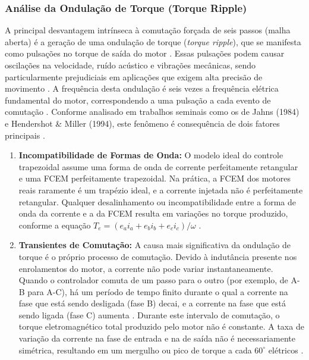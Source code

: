 \documentclass[12pt, a4paper, openright, oneside, brazilian]{abntex2}
\begin{document}
 \subsubsection{Análise da Ondulação de Torque (Torque Ripple)}
A principal desvantagem intrínseca à comutação forçada de seis passos (malha aberta) é a geração de uma ondulação de torque (\textit{torque ripple}), que se manifesta como pulsações no torque de saída do motor \cite{jahns1984, ali2017implementation}. Essas pulsações podem causar oscilações na velocidade, ruído acústico e vibrações mecânicas, sendo particularmente prejudiciais em aplicações que exigem alta precisão de movimento \cite{jahns1996pulsating}. A frequência desta ondulação é seis vezes a frequência elétrica fundamental do motor, correspondendo a uma pulsação a cada evento de comutação \cite{jahns1984}. Conforme analisado em trabalhos seminais como os de Jahns (1984) e Hendershot \& Miller (1994), este fenômeno é consequência de dois fatores principais \cite{kim2017, hendershot1994design}.

\begin{enumerate}
    \item \textbf{Incompatibilidade de Formas de Onda:} O modelo ideal do controle trapezoidal assume uma forma de onda de corrente perfeitamente retangular e uma FCEM perfeitamente trapezoidal. Na prática, a FCEM dos motores reais raramente é um trapézio ideal, e a corrente injetada não é perfeitamente retangular. Qualquer desalinhamento ou incompatibilidade entre a forma de onda da corrente e a da FCEM resulta em variações no torque produzido, conforme a equação $T_{e} = (e_{a}i_{a} + e_{b}i_{b} + e_{c}i_{c}) / \omega$ \cite{hendershot1994design}.

    \item \textbf{Transientes de Comutação:} A causa mais significativa da ondulação de torque é o próprio processo de comutação. Devido à indutância presente nos enrolamentos do motor, a corrente não pode variar instantaneamente. Quando o controlador comuta de um passo para o outro (por exemplo, de A-B para A-C), há um período de tempo finito durante o qual a corrente na fase que está sendo desligada (fase B) decai, e a corrente na fase que está sendo ligada (fase C) aumenta \cite{jahns1996pulsating, joice2013compensation}. Durante este intervalo de comutação, o torque eletromagnético total produzido pelo motor não é constante. A taxa de variação da corrente na fase de entrada e na de saída não é necessariamente simétrica, resultando em um mergulho ou pico de torque a cada $60^{\circ}$ elétricos \cite{choi1998commutation, chen2019commutation}.
\end{enumerate}
\end{document}
